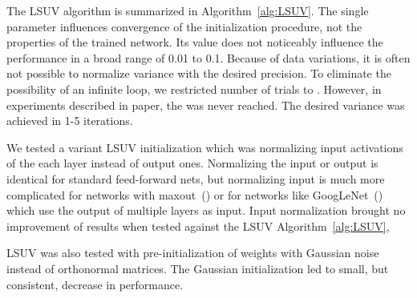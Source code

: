 \documentclass{article} \clearpage{}\usepackage{iclr2016_conference,times}
\begin{document}
The LSUV algorithm is summarized in Algorithm~\ref{alg:LSUV}.
The single parameter  influences convergence of the initialization procedure, not the properties of the trained network. Its value does not noticeably influence the performance in a broad range of 0.01 to 0.1. 
 Because of data variations, it is often not possible to normalize variance with the desired precision. To eliminate the possibility of an infinite loop, we restricted number of trials to . However, in experiments described in paper, the  was never reached. The desired variance was achieved in 1-5 iterations.
 
We tested a variant LSUV initialization which was normalizing input activations of the each layer instead of output ones. Normalizing the input or output is identical for standard feed-forward nets, but normalizing input is much more complicated for networks with maxout~(\cite{Maxout2013}) or for networks like GoogLeNet~(\cite{Googlenet2015}) which use the output of multiple layers as input. Input normalization brought no improvement of results when tested against the LSUV Algorithm~\ref{alg:LSUV},

LSUV was also tested with pre-initialization of weights with Gaussian noise instead of orthonormal matrices. The Gaussian initialization led to small, but consistent, decrease in performance.  
\end{document}
